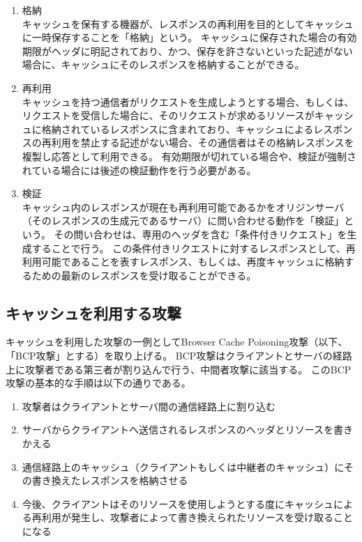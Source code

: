 \documentclass[12pt,a4paper]{jbook}
\begin{document}
\begin{enumerate}
\item 格納\\
キャッシュを保有する機器が、レスポンスの再利用を目的としてキャッシュに一時保存することを「格納」という。
キャッシュに保存された場合の有効期限がヘッダに明記されており、かつ、保存を許さないといった記述がない場合に、キャッシュにそのレスポンスを格納することができる。
\item 再利用\\
キャッシュを持つ通信者がリクエストを生成しようとする場合、もしくは、リクエストを受信した場合に、そのリクエストが求めるリソースがキャッシュに格納されているレスポンスに含まれており、キャッシュによるレスポンスの再利用を禁止する記述がない場合、その通信者はその格納レスポンスを複製し応答として利用できる。
有効期限が切れている場合や、検証が強制されている場合には後述の検証動作を行う必要がある。
\item 検証\\
キャッシュ内のレスポンスが現在も再利用可能であるかをオリジンサーバ（そのレスポンスの生成元であるサーバ）に問い合わせる動作を「検証」という。
その問い合わせは、専用のヘッダを含む「条件付きリクエスト」を生成することで行う。
この条件付きリクエストに対するレスポンスとして、再利用可能であることを表すレスポンス、もしくは、再度キャッシュに格納するための最新のレスポンスを受け取ることができる。
\end{enumerate}

\subsection{キャッシュを利用する攻撃}
\label{sec:bcpattack}
キャッシュを利用した攻撃の一例としてBrowser Cache Poisoning攻撃（以下、「BCP攻撃」とする）\cite{bcpattack}を取り上げる。
BCP攻撃はクライアントとサーバの経路上に攻撃者である第三者が割り込んで行う、中間者攻撃に該当する。
このBCP攻撃の基本的な手順は以下の通りである。
\begin{enumerate}
\item 攻撃者はクライアントとサーバ間の通信経路上に割り込む
\item サーバからクライアントへ送信されるレスポンスのヘッダとリソースを書きかえる
\item 通信経路上のキャッシュ（クライアントもしくは中継者のキャッシュ）にその書き換えたレスポンスを格納させる
\item 今後、クライアントはそのリソースを使用しようとする度にキャッシュによる再利用が発生し、攻撃者によって書き換えられたリソースを受け取ることになる
\end{enumerate}
\end{document}
